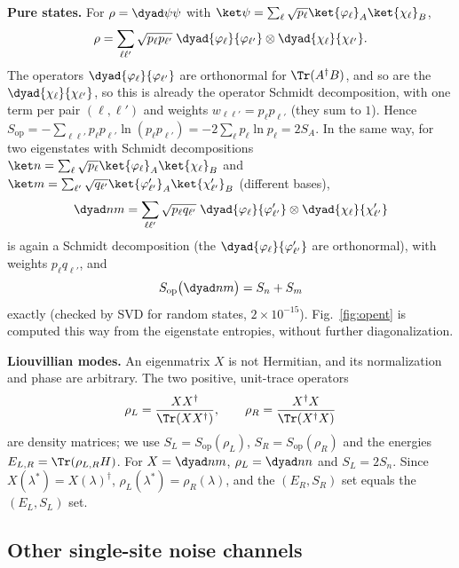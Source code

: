 \textbf{Pure states.} For $\rho = \dyad\psi\psi$ with $\ket\psi = \sum_\ell\sqrt{p_\ell}\ket{\varphi_\ell}_A\ket{\chi_\ell}_B$,
\[ \rho = \sum_{\ell\ell'}\sqrt{p_\ell p_{\ell'}}\;\dyad{\varphi_\ell}{\varphi_{\ell'}}\otimes\dyad{\chi_\ell}{\chi_{\ell'}} . \]
The operators $\dyad{\varphi_\ell}{\varphi_{\ell'}}$ are orthonormal for $\Tr(A^\dagger B)$, and so are the $\dyad{\chi_\ell}{\chi_{\ell'}}$, so this is already the operator Schmidt decomposition, with one term per pair $(\ell, \ell')$ and weights $w_{\ell\ell'} = p_\ell p_{\ell'}$ (they sum to $1$). Hence $S_{\mathrm{op}} = -\sum_{\ell\ell'}p_\ell p_{\ell'}\ln(p_\ell p_{\ell'}) = -2\sum_\ell p_\ell\ln p_\ell = 2S_A$. In the same way, for two eigenstates with Schmidt decompositions $\ket n = \sum_\ell\sqrt{p_\ell}\ket{\varphi_\ell}_A\ket{\chi_\ell}_B$ and $\ket m = \sum_{\ell'}\sqrt{q_{\ell'}}\ket{\varphi'_{\ell'}}_A\ket{\chi'_{\ell'}}_B$ (different bases),
\[ \dyad nm = \sum_{\ell\ell'}\sqrt{p_\ell q_{\ell'}}\;\dyad{\varphi_\ell}{\varphi'_{\ell'}}\otimes\dyad{\chi_\ell}{\chi'_{\ell'}} \]
is again a Schmidt decomposition (the $\dyad{\varphi_\ell}{\varphi'_{\ell'}}$ are orthonormal), with weights $p_\ell q_{\ell'}$, and
\begin{equation}
S_{\mathrm{op}}\big(\dyad nm\big) = S_n + S_m
\end{equation}
exactly (checked by SVD for random states, $2\times10^{-15}$). Fig.~\ref{fig:opent} is computed this way from the eigenstate entropies, without further diagonalization.

\textbf{Liouvillian modes.} An eigenmatrix $X$ is not Hermitian, and its normalization and phase are arbitrary. The two positive, unit-trace operators
\begin{equation}
\rho_L = \frac{XX^\dagger}{\Tr(XX^\dagger)}, \qquad \rho_R = \frac{X^\dagger X}{\Tr(X^\dagger X)}
\end{equation}
are density matrices; we use $S_L = S_{\mathrm{op}}(\rho_L)$, $S_R = S_{\mathrm{op}}(\rho_R)$ and the energies $E_{L,R} = \Tr(\rho_{L,R}H)$. For $X = \dyad nm$, $\rho_L = \dyad nn$ and $S_L = 2S_n$. Since $X(\lambda^*) = X(\lambda)^\dagger$, $\rho_L(\lambda^*) = \rho_R(\lambda)$, and the $(E_R, S_R)$ set equals the $(E_L, S_L)$ set.

\subsection{Other single-site noise channels}
\label{sec:channels}

